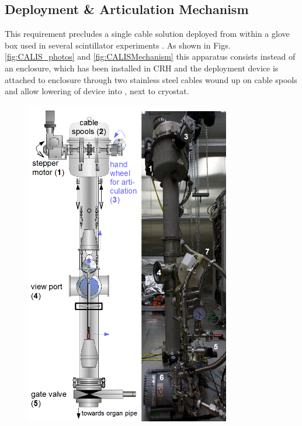 \subsection{Deployment \& Articulation Mechanism}\label{sec:DeploymentArticulation}
This requirement precludes a single cable solution deployed from within a glove box used in several scintillator experiments \cite{Banks:2014hra, Huang:2013uxa}. %
As shown in Figs. \ref{fig:CALIS_photos} and \ref{fig:CALISMechanism} this apparatus consists instead of an enclosure, which has been installed in CRH and the deployment device is attached to enclosure through two stainless steel cables wound up on cable spools and allow lowering of device into \lsv, next to cryostat.
\begin{figure}[htbp]
 \centering
\includegraphics[width=0.8\textwidth]{Figures/CALIS_overview.png}

\end{figure}
